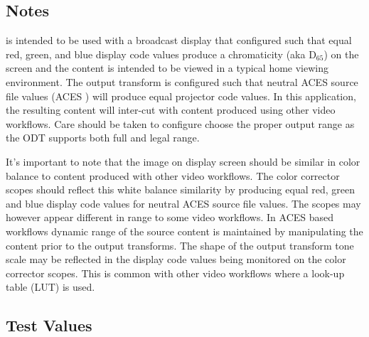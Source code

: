 \subsection{Notes}
\label{subsec:notes-\id}

is intended to be used with a broadcast display that configured such that equal red, green, and blue display code values produce a chromaticity  (aka D$_{65}$) on the screen and the content is intended to be viewed in a typical home viewing environment. The output transform is configured such that neutral ACES source file values (ACES \rgbequal) will produce equal projector code values. In this application, the resulting content will inter-cut with content produced using other video workflows.  Care should be taken to configure choose the proper output range as the ODT supports both full and legal range.

It's important to note that the image on display screen should be similar in color balance to content produced with other video workflows. The color corrector scopes should reflect this white balance similarity by producing equal red, green and blue display code values for neutral ACES source file values. The scopes may however appear different in range to some video workflows.  In ACES based workflows dynamic range of the source content is maintained by manipulating the content prior to the output transforms.  The shape of the output transform tone scale may be reflected in the display code values being monitored on the color corrector scopes.  This is common with other video workflows where a look-up table (LUT) is used.

\subsection{Test Values}
\label{subsec:testValues-\id}

\testValuesSubSec{}




